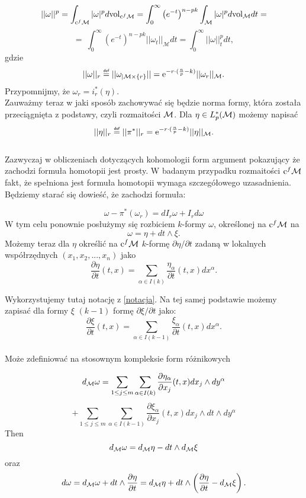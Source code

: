 \documentclass[licencjacka]{pracamgr}
\theoremstyle{definition}
\theoremstyle{definition}
\theoremstyle{plain}
\theoremstyle{plain}
\def\cfm{\ensuremath\mathrm{c}^f\mathcal{M}}
\def\M{\ensuremath\mathcal{M}}
\newcommand\deff{\mathrel{\overset{\makebox[0pt]{\mbox{\normalfont\tiny\sffamily def}}}{=}}}
\begin{document}
\[
    ||\omega ||^p = \int_{\cfm} |\omega |^p d \mathrm{vol}_{\cfm} =
    \int_0^\infty \left( e^{-t} \right)^{n-pk} \int_\mathcal{M} |\omega|^p d
    \mathrm{vol}_\mathcal{M} dt = 
\]
\[
    = \
    \int_0^\infty \left( e^{-t} \right)^{n-pk} || \omega_t ||_{\mathcal{M}} dt = 
    \int_0^\infty || \omega ||_t^p dt,
\] 
gdzie
\[
|| \omega ||_r \deff || \omega_{|\mathcal{M} \times \{r\} } || =
\mathrm{e}^{-r \cdot (\frac{n}{p} - k) }  ||\omega_r ||_{\M}.
\]
Przypomnijmy, że $\omega_r = i_r^\ast (\eta)$. \\

Zauważmy teraz w jaki sposób zachowywać się będzie norma formy, która
została przeciągnięta z podstawy, czyli rozmaitości $\M$. Dla 
$\eta \in L_p^\ast (\M)$ możemy napisać
\[
    || \eta ||_r \deff || \pi^\ast ||_r = 
\mathrm{e}^{-r \cdot (\frac{n}{p} - k) }  ||\eta ||_{\M}.
\] \\

Zazwyczaj w obliczeniach dotyczących kohomologii form argument pokazujący
że zachodzi formuła homotopii jest prosty. %
W badanym przypadku rozmaitości $\cfm$ fakt, że spełniona jest formuła homotopii
wymaga szczegółowego uzasadnienia. \\


Będziemy starać się dowieść, że zachodzi formuła:

\[
    \omega - \pi^\ast(\omega_r) = dI_r \omega + I_r d\omega
\]
W tym celu ponownie posłużymy się rozbiciem $k$-formy $\omega$, określonej na
$\cfm$ na
\[
    \omega = \eta + dt \wedge \xi.
\] 
Możemy teraz dla $\eta$ określić na $\cfm$ $k$-formę $\partial \eta / \partial
t$ zadaną w lokalnych współrzędnych $(x_1, x_2, ..., x_n)$ jako
\[
    \frac{\partial \eta}{\partial t} (t, x) =
    \sum_{\alpha \in I(k)} \frac{\eta_\alpha}{\partial t}(t, x) dx^\alpha.
\]

Wykorzystujemy tutaj notację z \ref{notacja}. Na tej samej podstawie możemy 
zapisać dla formy $\xi$ $(k-1)$ formę $\partial \xi / \partial t$ jako:
\[
    \frac{\partial \xi}{\partial t} (t, x) =
    \sum_{\alpha \in I(k-1)} \frac{\xi_\alpha}{\partial t}(t, x) dx^\alpha. 
\] \\

Może zdefiniować na stosownym
kompleksie form różnikowych

\[
    d_\M \omega =  
    \sum_{1 \leq j \leq m} \sum_{\alpha \in I(k)}
    \frac{\partial \eta_\alpha}{\partial x_j}(t, x) dx_j \wedge dy^\alpha
\]
\[
    + \sum_{1 \leq j \leq m} \sum_{\alpha \in I(k-1)}
    \frac{\partial \xi_\alpha}{\partial x_j}(t, x) dx_j \wedge dt \wedge dy^\alpha
\]
Then 
\[
    d_\M \omega = d_\M \eta - dt \wedge d_\M \xi
\]
oraz
\[
    d \omega = 
    d_\M \omega + dt \wedge \frac{\partial \eta}{\partial t} = 
    d_\M \eta + dt \wedge \left( 
        \frac{\partial \eta}{\partial t} - d_\M \xi
    \right). \\
\]
\end{document}
